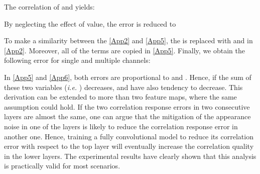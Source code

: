 \documentclass[journal]{IEEEtran}
\begin{document}
The correlation of  and  yields:

By neglecting the effect of  value, the error is reduced to

To make a similarity between the \eqref{App2} and \eqref{App5}, the  is replaced with  and  in \eqref{App2}. Moreover, all of the terms are copied in \eqref{App5}. Finally, we obtain the following error for single and multiple channels:
\footnotesize

\normalsize
In \eqref{App5} and \eqref{App6}, both errors are proportional to  and . Hence, if the sum of these two variables (\emph{i.e.} ) decreases,  and  have also tendency to decrease. This derivation can be extended to more than two feature maps, where the same assumption could hold. If the two correlation response errors in two consecutive layers are almost the same, one can argue that the mitigation of the appearance noise in one of the layers is likely to reduce the correlation response error in another one. Hence, training a fully convolutional model to reduce its correlation error with respect to the top layer will eventually increase the correlation quality in the lower layers. The experimental results have clearly shown that this analysis is practically valid for most scenarios.


\ifCLASSOPTIONcaptionsoff
  \newpage
\fi



\end{document}
